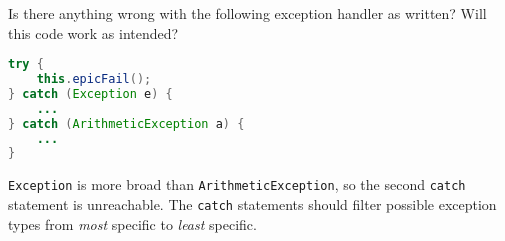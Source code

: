 Is there anything wrong with the following exception handler as written? Will this
code work as intended? 
\begin{lstlisting}[language=java,numbers=none]
try {
	this.epicFail();
} catch (Exception e) {
	...
} catch (ArithmeticException a) {
	...
}
\end{lstlisting}
\begin{answer}
\texttt{Exception} is more broad than \texttt{ArithmeticException},
so the second \texttt{catch} statement is unreachable.
The \texttt{catch} statements should filter possible exception types
from \textit{most} specific to \textit{least} specific.
\end{answer}